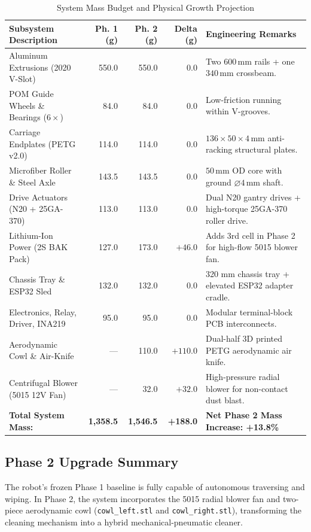\documentclass[10pt,a4paper]{article}
\begin{document}
\begin{table}[H]
\centering
\small
\begin{tabularx}{\textwidth}{p{4.8cm} r r r X}
\toprule
\textbf{Subsystem Description} & \textbf{Ph. 1 (g)} & \textbf{Ph. 2 (g)} & \textbf{Delta (g)} & \textbf{Engineering Remarks} \\
\midrule
Aluminum Extrusions (2020 V-Slot) & 550.0 & 550.0 & $0.0$ & Two $600\,\text{mm}$ rails + one $340\,\text{mm}$ crossbeam. \\
POM Guide Wheels \& Bearings ($6\times$) & 84.0 & 84.0 & $0.0$ & Low-friction running within V-grooves. \\
Carriage Endplates (PETG v2.0) & 114.0 & 114.0 & $0.0$ & $136 \times 50 \times 4\,\text{mm}$ anti-racking structural plates. \\
Microfiber Roller \& Steel Axle & 143.5 & 143.5 & $0.0$ & $50\,\text{mm OD}$ core with ground $\varnothing 4\,\text{mm}$ shaft. \\
Drive Actuators (N20 + 25GA-370) & 113.0 & 113.0 & $0.0$ & Dual N20 gantry drives + high-torque 25GA-370 roller drive. \\
Lithium-Ion Power (2S BAK Pack) & 127.0 & 173.0 & $+46.0$ & Adds 3rd cell in Phase 2 for high-flow 5015 blower fan. \\
Chassis Tray \& ESP32 Sled & 132.0 & 132.0 & $0.0$ & 320 mm chassis tray + elevated ESP32 adapter cradle. \\
Electronics, Relay, Driver, INA219 & 95.0 & 95.0 & $0.0$ & Modular terminal-block PCB interconnects. \\
Aerodynamic Cowl \& Air-Knife & --- & 110.0 & $+110.0$ & Dual-half 3D printed PETG aerodynamic air knife. \\
Centrifugal Blower (5015 12V Fan) & --- & 32.0 & $+32.0$ & High-pressure radial blower for non-contact dust blast. \\
\midrule
\textbf{Total System Mass:} & \textbf{1,358.5} & \textbf{1,546.5} & \textbf{+188.0} & \textbf{Net Phase 2 Mass Increase: +13.8\%} \\
\bottomrule
\end{tabularx}
\caption{System Mass Budget and Physical Growth Projection}
\label{tab:mass_budget}
\end{table}

\subsection{Phase 2 Upgrade Summary}
The robot's frozen Phase 1 baseline is fully capable of autonomous traversing and wiping. In Phase 2, the system incorporates the 5015 radial blower fan and two-piece aerodynamic cowl (\texttt{cowl\_left.stl} and \texttt{cowl\_right.stl}), transforming the cleaning mechanism into a hybrid mechanical-pneumatic cleaner.
\end{document}
